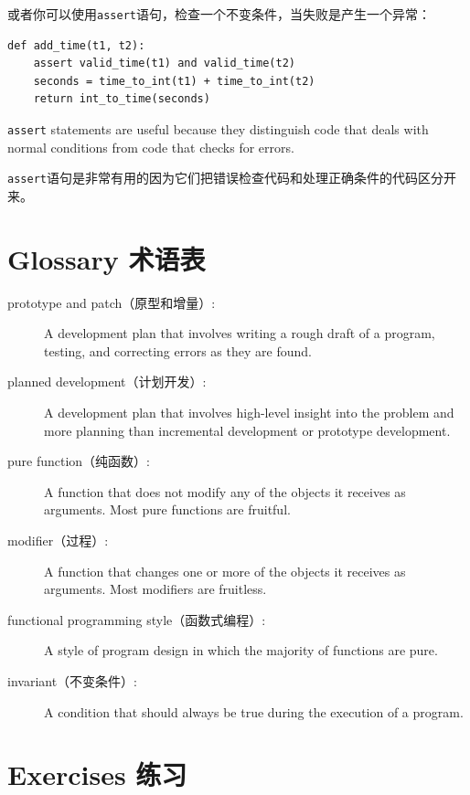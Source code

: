 \documentclass[10pt]{book}
\begin{document}
\begin{CJK}{UTF8}{gbsn}
或者你可以使用{\tt assert}语句，检查一个不变条件，当失败是产生一个异常：

\begin{verbatim}
def add_time(t1, t2):
    assert valid_time(t1) and valid_time(t2)
    seconds = time_to_int(t1) + time_to_int(t2)
    return int_to_time(seconds)
\end{verbatim}
%
{\tt assert} statements are useful because they distinguish
code that deals with normal conditions from code
that checks for errors.

{\tt assert}语句是非常有用的因为它们把错误检查代码和处理正确条件的代码区分开来。


\section{Glossary 术语表}

\begin{description}

\item[prototype and patch（原型和增量）:] A development plan that involves
writing a rough draft of a program, testing, and correcting errors as
they are found.

\item[planned development（计划开发）:] A development plan that involves
high-level insight into the problem and more planning than incremental
development or prototype development.

\item[pure function（纯函数）:] A function that does not modify any of the objects it
receives as arguments.  Most pure functions are fruitful.

\item[modifier（过程）:] A function that changes one or more of the objects it
receives as arguments.  Most modifiers are fruitless.

\item[functional programming style（函数式编程）:] A style of program design in which the
majority of functions are pure.

\item[invariant（不变条件）:] A condition that should always be true during the
execution of a program.

\end{description}


\section{Exercises 练习}


\end{CJK}
\end{document}
